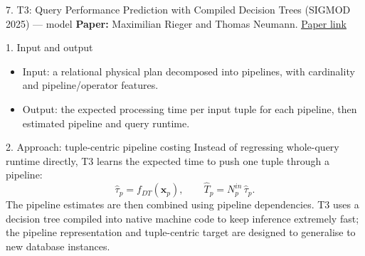 \documentclass[aspectratio=169,10pt]{beamer}
\newcommand{\paperlink}[2]{\href{#1}{\textcolor{WayangTeal}{\underline{#2}}}}
\begin{document}
\begin{frame}[shrink=10]{7. T3: Query Performance Prediction with Compiled Decision Trees (SIGMOD 2025) — model}
\small
\textbf{Paper:} Maximilian Rieger and Thomas Neumann.
\hfill\paperlink{https://doi.org/10.1145/3725364}{Paper link}

\begin{block}{1. Input and output}
\begin{itemize}\setlength\itemsep{1pt}
  \item Input: a relational physical plan decomposed into pipelines, with cardinality and pipeline/operator features.
  \item Output: the expected processing time per input tuple for each pipeline, then estimated pipeline and query runtime.
\end{itemize}
\end{block}

\begin{block}{2. Approach: tuple-centric pipeline costing}
Instead of regressing whole-query runtime directly, T3 learns the expected time to push one tuple through a pipeline:
\[
  \widehat{\tau}_p = f_{DT}(\mathbf x_p), \qquad
  \widehat{T}_p = N^{in}_p\,\widehat{\tau}_p.
\]
The pipeline estimates are then combined using pipeline dependencies. T3 uses a decision tree compiled into native machine code to keep inference extremely fast; the pipeline representation and tuple-centric target are designed to generalise to new database instances.
\end{block}
\end{frame}
\end{document}
